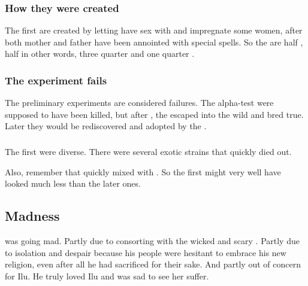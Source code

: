 \subsubsection{How they were created}
The first \humans{} are created by letting \Thanatzil{} have sex with and impregnate some \nephilic{} women, after both mother and father have been annointed with special spells. 
So the \humans{} are half \nephil, half \resphan\dash in other words, three quarter \nephil{} and one quarter \bane. 





\subsubsection{The experiment fails}
The preliminary \human{} experiments are considered failures. 
The alpha-test \humans{} were supposed to have been killed, but after , the \humans{} escaped into the wild and bred true. 
Later they would be rediscovered and adopted by the \resphain. 





\subsubsection{\Demihumans}
The first \humans were diverse. 
There were several exotic  strains that quickly died out. 

Also, remember that \humans quickly mixed with \nephilim. 
So the first \humans might very well have looked much less \quo{\human} than the later ones. 









\subsection{Madness}
\Semiza{} was going mad. 
Partly due to consorting with the wicked and scary \banes. 
Partly due to isolation and despair because his people were hesitant to embrace his new religion, even after all he had sacrificed for their sake. 
And partly out of concern for Ilu. 
He truly loved Ilu and was sad to see her suffer. 


